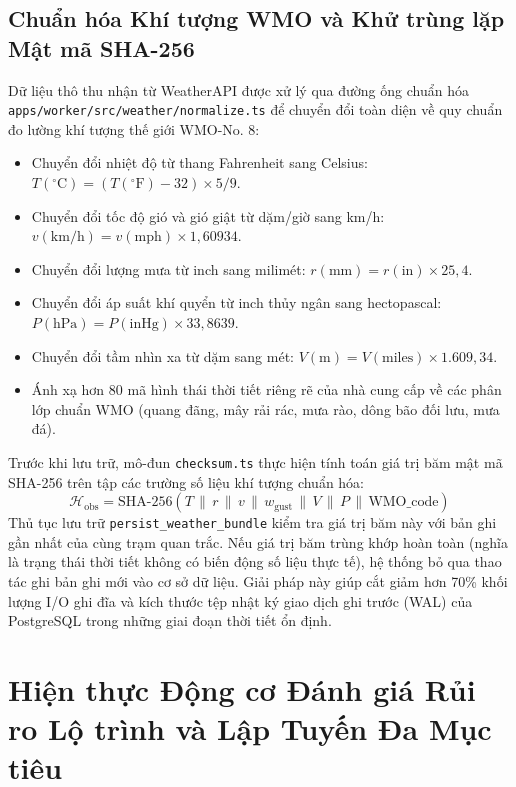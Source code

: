 \subsection{Chuẩn hóa Khí tượng WMO và Khử trùng lặp Mật mã SHA-256}
Dữ liệu thô thu nhận từ WeatherAPI được xử lý qua đường ống chuẩn hóa \texttt{apps/\allowbreak worker/\allowbreak src/\allowbreak weather/\allowbreak normalize.ts} để chuyển đổi toàn diện về quy chuẩn đo lường khí tượng thế giới WMO-No. 8:
\begin{itemize}
    \item[-] Chuyển đổi nhiệt độ từ thang Fahrenheit sang Celsius: $T(^\circ\text{C}) = (T(^\circ\text{F}) - 32) \times 5/9$.
    \item[-] Chuyển đổi tốc độ gió và gió giật từ dặm/giờ sang km/h: $v(\text{km/h}) = v(\text{mph}) \times 1{,}60934$.
    \item[-] Chuyển đổi lượng mưa từ inch sang milimét: $r(\text{mm}) = r(\text{in}) \times 25{,}4$.
    \item[-] Chuyển đổi áp suất khí quyển từ inch thủy ngân sang hectopascal: $P(\text{hPa}) = P(\text{inHg}) \times 33{,}8639$.
    \item[-] Chuyển đổi tầm nhìn xa từ dặm sang mét: $V(\text{m}) = V(\text{miles}) \times 1.609{,}34$.
    \item[-] Ánh xạ hơn 80 mã hình thái thời tiết riêng rẽ của nhà cung cấp về các phân lớp chuẩn WMO (quang đãng, mây rải rác, mưa rào, dông bão đối lưu, mưa đá).
\end{itemize}

Trước khi lưu trữ, mô-đun \texttt{checksum.ts} thực hiện tính toán giá trị băm mật mã SHA-256 trên tập các trường số liệu khí tượng chuẩn hóa:
\begin{equation}
\label{eq:checksum_hash_vi}
\mathcal{H}_{\text{obs}} = \text{SHA-256}(T \,\|\, r \,\|\, v \,\|\, w_{\text{gust}} \,\|\, V \,\|\, P \,\|\, \text{WMO\_code})
\end{equation}
Thủ tục lưu trữ \texttt{persist\_weather\_bundle} kiểm tra giá trị băm này với bản ghi gần nhất của cùng trạm quan trắc. Nếu giá trị băm trùng khớp hoàn toàn (nghĩa là trạng thái thời tiết không có biến động số liệu thực tế), hệ thống bỏ qua thao tác ghi bản ghi mới vào cơ sở dữ liệu. Giải pháp này giúp cắt giảm hơn 70\% khối lượng I/O ghi đĩa và kích thước tệp nhật ký giao dịch ghi trước (WAL) của PostgreSQL trong những giai đoạn thời tiết ổn định.

\section{Hiện thực Động cơ Đánh giá Rủi ro Lộ trình và Lập Tuyến Đa Mục tiêu}
\label{sec:route_hazard_impl}

